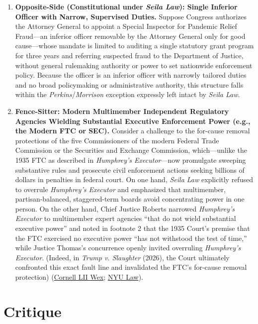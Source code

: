 \documentclass[12pt]{article}
\begin{document}
\begin{enumerate}
\item \textbf{Opposite-Side (Constitutional under \textit{Seila Law}): Single Inferior Officer with Narrow, Supervised Duties.} Suppose Congress authorizes the Attorney General to appoint a Special Inspector for Pandemic Relief Fraud---an inferior officer removable by the Attorney General only for good cause---whose mandate is limited to auditing a single statutory grant program for three years and referring suspected fraud to the Department of Justice, without general rulemaking authority or power to set nationwide enforcement policy. Because the officer is an inferior officer with narrowly tailored duties and no broad policymaking or administrative authority, this structure falls within the \textit{Perkins}/\textit{Morrison} exception expressly left intact by \textit{Seila Law}.

\item \textbf{Fence-Sitter: Modern Multimember Independent Regulatory Agencies Wielding Substantial Executive Enforcement Power (e.g., the Modern FTC or SEC).} Consider a challenge to the for-cause removal protections of the five Commissioners of the modern Federal Trade Commission or the Securities and Exchange Commission, which---unlike the 1935 FTC as described in \textit{Humphrey's Executor}---now promulgate sweeping substantive rules and prosecute civil enforcement actions seeking billions of dollars in penalties in federal court. On one hand, \textit{Seila Law} explicitly refused to overrule \textit{Humphrey's Executor} and emphasized that multimember, partisan-balanced, staggered-term boards avoid concentrating power in one person. On the other hand, Chief Justice Roberts narrowed \textit{Humphrey's Executor} to multimember expert agencies ``that do not wield substantial executive power'' and noted in footnote 2 that the 1935 Court's premise that the FTC exercised no executive power ``has not withstood the test of time,'' while Justice Thomas's concurrence openly invited overruling \textit{Humphrey's Executor}. (Indeed, in \textit{Trump v. Slaughter} (2026), the Court ultimately confronted this exact fault line and invalidated the FTC's for-cause removal protection) (\href{https://www.law.cornell.edu/wex/unitary_executive_theory_\%28uet\%29}{Cornell LII Wex}; \href{https://www.law.nyu.edu/sites/default/files/2026-08/KKR\%2C-Officer-Removal-in-the-Early-Republic-20260731.pdf}{NYU Law}).
\end{enumerate}

\section{Critique}
\end{document}
